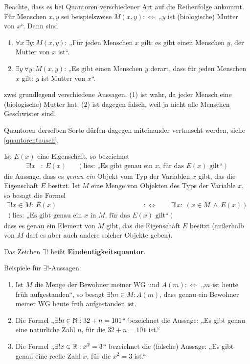 
\begin{bem} \label{quantorreihenfolge}
    Beachte, dass es bei Quantoren verschiedener Art auf die Reihenfolge ankommt. Für Menschen $x,y$ sei beispielsweise $M(x,y):\Leftrightarrow$ „$y$ ist (biologische) Mutter von $x$“. Dann sind
    \begin{enumerate}[(1)]
        \item $\forall x\ \exists y: M(x,y)$: „Für jeden Menschen $x$ gilt: es gibt einen Menschen $y$, der Mutter von $x$ ist“.
        \item $\exists y\ \forall y: M(x,y)$: „Es gibt einen Menschen $y$ derart, dass für jeden Menschen $x$ gilt: $y$ ist Mutter von $x$“.
    \end{enumerate}
    zwei grundlegend verschiedene Aussagen. (1) ist wahr, da jeder Mensch eine (biologische) Mutter hat; (2) ist dagegen falsch, weil ja nicht alle Menschen Geschwister sind.
    
    Quantoren derselben Sorte dürfen dagegen miteinander vertauscht werden, siehe \cref{quantorentausch}.
\end{bem}


\begin{de} \label{def:eindquant}
    Ist $E(x)$ eine Eigenschaft, so bezeichnet
    \begin{align*}
        \exists ! x& :\ E(x) && (\text{lies: „Es gibt genau ein $x$, für das $E(x)$ gilt“})
    \end{align*}
    die Aussage, dass es \emph{genau ein} Objekt vom Typ der Variablen $x$ gibt, das die Eigenschaft $E$ besitzt. Ist $M$ eine Menge von Objekten des Typs der Variable $x$, so besagt die Formel
    \begin{align*}
        \exists ! x\in M :\ E(x) \qquad &:\Leftrightarrow\qquad \exists ! x:\ (x\in M\ \land\ E(x)) \\
        (\text{lies: „Es gibt genau ein $x$ in $M$, für das $E(x)$ gilt“})
    \end{align*}
    dass es genau ein Element von $M$ gibt, das die Eigenschaft $E$ besitzt (außerhalb von $M$ darf es aber auch andere solcher Objekte geben).
    
    Das Zeichen $\exists !$ heißt \textbf{Eindeutigkeitsquantor}.
\end{de}


\begin{bsp}
    Beispiele für $\exists !$-Aussagen:
    \begin{enumerate}
        \item Ist $M$ die Menge der Bewohner meiner WG und $A(m):\Leftrightarrow$ „$m$ ist heute früh aufgestanden“, so besagt $\exists ! m\in M: A(m)$, dass genau ein Bewohner meiner WG heute früh aufgestanden ist.
        \item Die Formel „$\exists ! n\in \mathbb N : 32+n = 101$“ bezeichnet die Aussage: „Es gibt genau eine natürliche Zahl $n$, für die $32+n=101$ ist.“
        \item Die Formel „$\exists ! x\in \mathbb R: x^2=3$“ bezeichnet die (falsche) Aussage: „Es gibt genau eine reelle Zahl $x$, für die $x^2=3$ ist.“
    \end{enumerate}
\end{bsp}


